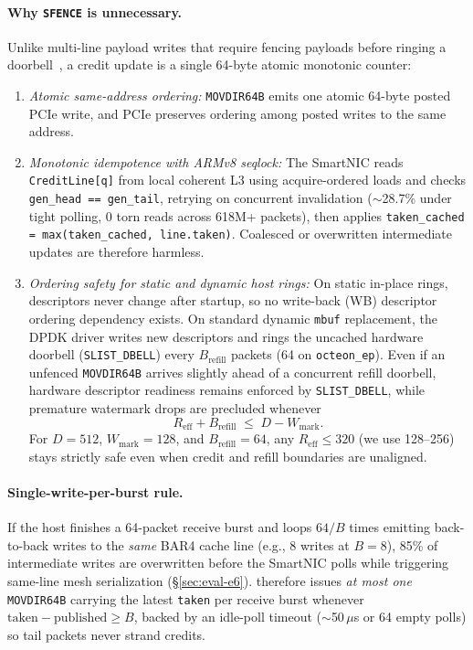 \paragraph{Why \texttt{SFENCE} is unnecessary.}
Unlike multi-line payload writes that require fencing payloads before ringing a
doorbell~\cite{liew2026asplos}, a credit update is a single 64-byte atomic
monotonic counter:
\begin{enumerate}
\item \emph{Atomic same-address ordering:} \texttt{MOVDIR64B} emits one atomic
  64-byte posted PCIe write, and PCIe preserves ordering among posted writes to
  the same address.
\item \emph{Monotonic idempotence with ARMv8 seqlock:} The SmartNIC reads
  \texttt{CreditLine[q]} from local coherent L3 using acquire-ordered loads and
  checks \texttt{gen\_head == gen\_tail}, retrying on concurrent invalidation
  ($\sim$28.7\% under tight polling, 0 torn reads across 618M+ packets), then
  applies \texttt{taken\_cached = max(taken\_cached, line.taken)}. Coalesced
  or overwritten intermediate updates are therefore harmless.
\item \emph{Ordering safety for static and dynamic host rings:} On static
  in-place rings, descriptors never change after startup, so no write-back (WB)
  descriptor ordering dependency exists. On standard dynamic \texttt{mbuf}
  replacement, the DPDK driver writes new descriptors and rings the uncached
  hardware doorbell (\texttt{SLIST\_DBELL}) every $B_{\text{refill}}$ packets
  (64 on \texttt{octeon\_ep}). Even if an unfenced \texttt{MOVDIR64B} arrives
  slightly ahead of a concurrent refill doorbell, hardware descriptor readiness
  remains enforced by \texttt{SLIST\_DBELL}, while premature watermark drops
  are precluded whenever
  \begin{equation}
    R_{\text{eff}} + B_{\text{refill}} \;\le\; D - W_{\text{mark}}.
    \label{eq:wmark-invariant}
  \end{equation}
  For $D=512$, $W_{\text{mark}}=128$, and $B_{\text{refill}}=64$, any
  $R_{\text{eff}} \le 320$ (we use 128--256) stays strictly safe even when
  credit and refill boundaries are unaligned.
\end{enumerate}

\paragraph{Single-write-per-burst rule.}
If the host finishes a 64-packet receive burst and loops $64/B$ times emitting
back-to-back writes to the \emph{same} BAR4 cache line (e.g., 8 writes at
$B=8$), 85\% of intermediate writes are overwritten before the SmartNIC polls
while triggering same-line mesh serialization (\S\ref{sec:eval-e6}). \sys{}
therefore issues \emph{at most one} \texttt{MOVDIR64B} carrying the latest
\texttt{taken} per receive burst whenever $\text{taken} - \text{published} \ge B$,
backed by an idle-poll timeout ($\sim$50\,$\mu$s or 64 empty polls) so tail
packets never strand credits.

